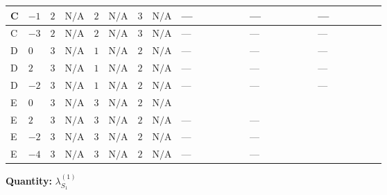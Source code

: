 \documentclass[8pt]{article}
\begin{document}
\begin{landscape}
\begin{longtable}{@{}llcccccc >{\raggedright\arraybackslash}p{0.21\linewidth} >{\raggedright\arraybackslash}p{0.21\linewidth} >{\raggedright\arraybackslash}p{0.21\linewidth}@{}}
\midrule
C & $-1$ & $2$ & $\text{N/A}$ & $2$ & $\text{N/A}$ & $3$ & $\text{N/A}$ & --- & --- & --- \\
\midrule
C & $-3$ & $2$ & $\text{N/A}$ & $2$ & $\text{N/A}$ & $3$ & $\text{N/A}$ & --- & --- & --- \\
\midrule
D & $0$ & $3$ & $\text{N/A}$ & $1$ & $\text{N/A}$ & $2$ & $\text{N/A}$ & --- & --- & --- \\
\midrule
D & $2$ & $3$ & $\text{N/A}$ & $1$ & $\text{N/A}$ & $2$ & $\text{N/A}$ & --- & --- & --- \\
\midrule
D & $-2$ & $3$ & $\text{N/A}$ & $1$ & $\text{N/A}$ & $2$ & $\text{N/A}$ & --- & --- & --- \\
\midrule
E & $0$ & $3$ & $\text{N/A}$ & $3$ & $\text{N/A}$ & $2$ & $\text{N/A}$ & \scriptsize\adjustbox{max width=\linewidth}{$\begin{gathered} \frac{8}{3} {\lambda_{X_{5}}^{(1)}} (3 \left({\lambda_{X_{5}}^{(1)}}\right)^{*}+\left({\lambda_{X_{5}}^{(2)}}\right)^{*})\end{gathered}$} & \scriptsize\adjustbox{max width=\linewidth}{$\begin{gathered} +{\lambda_{X_{5}}^{(2)}} \left(\frac{8 \left({\lambda_{X_{5}}^{(1)}}\right)^{*}}{3}+4 \left({\lambda_{X_{5}}^{(2)}}\right)^{*}\right)\end{gathered}$} & \scriptsize\adjustbox{max width=\linewidth}{$\begin{gathered} +8 {\lambda_{12}^{(1)}} {\lambda_{12}^{(\times)}}\end{gathered}$} \\
\midrule
E & $2$ & $3$ & $\text{N/A}$ & $3$ & $\text{N/A}$ & $2$ & $\text{N/A}$ & --- & --- & \scriptsize\adjustbox{max width=\linewidth}{$\begin{gathered} +8 {\lambda_{12}^{(1)}} {\lambda_{12}^{(\times)}}\end{gathered}$} \\
\midrule
E & $-2$ & $3$ & $\text{N/A}$ & $3$ & $\text{N/A}$ & $2$ & $\text{N/A}$ & --- & --- & \scriptsize\adjustbox{max width=\linewidth}{$\begin{gathered} +8 {\lambda_{12}^{(1)}} {\lambda_{12}^{(\times)}}\end{gathered}$} \\
\midrule
E & $-4$ & $3$ & $\text{N/A}$ & $3$ & $\text{N/A}$ & $2$ & $\text{N/A}$ & --- & --- & \scriptsize\adjustbox{max width=\linewidth}{$\begin{gathered} +8 {\lambda_{12}^{(1)}} {\lambda_{12}^{(\times)}}\end{gathered}$} \\
\midrule
\bottomrule
\end{longtable}
\clearpage
\noindent\textbf{Quantity: }$\lambda_{S_1}^{(1)}$\par\smallskip

\end{landscape}
\end{document}
